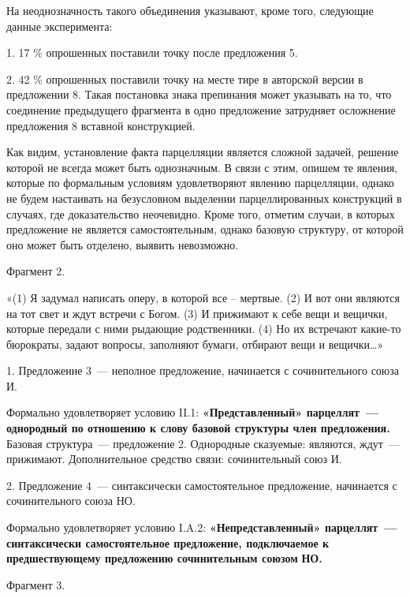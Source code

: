 \documentclass{kursa4}
\begin{document}
{      {}{На неоднозначность такого объединения указывают, кроме того, следующие данные эксперимента:}

      {1. 17 \% опрошенных поставили точку после предложения 5.}

      {2. }{42 \%
      опрошенных поставили точку на месте тире в авторской версии в предложении 8. Такая постановка знака препинания может указывать на то, что соединение предыдущего фрагмента в одно предложение затрудняет осложнение предложения 8 вставной конструкцией. }

      {Как видим, установление факта парцелляции является сложной задачей, решение которой не всегда может быть однозначным. В связи с этим, опишем те явления, которые по формальным условиям удовлетворяют явлению парцелляции, однако не будем настаивать на безусловном выделении парцеллированных конструкций в случаях, где доказательство неочевидно. Кроме того, отметим случаи, в которых предложение не
      }{является}{
      самостоятельным, однако базовую структуру, от которой оно может быть отделено, выявить невозможно. }

      {Фрагмент 2. }

      {«(1) Я задумал написать оперу, в которой все – мертвые. (2) И вот они являются на тот свет и ждут встречи с Богом. (3) И прижимают к себе вещи и вещички, которые передали с ними рыдающие родственники. (4) Но их встречают какие-то бюрократы, задают вопросы, заполняют бумаги, отбирают вещи и вещички…»}

      {1. Предложение 3~--- неполное предложение, начинается с сочинительного союза И.}

      {Формально удовлетворяет условию II.1:
      }\textbf{{«Представленный» парцеллят~--- однородный по отношению к слову базовой структуры член предложения.
      }}{Базовая структура~--- предложение 2. Однородные сказуемые: являются, ждут~--- прижимают. Дополнительное средство связи: сочинительный союз И.}

      {2. Предложение 4~--- синтаксически самостоятельное предложение, начинается с сочинительного союза НО.}



      {Формально удовлетворяет условию I.A.2:
      }\textbf{{«Непредставленный» п}}\textbf{{арцеллят~--- синтаксически самостоятельное предложение, подключаемое к предшествующему предложению сочинительным союз}}\textbf{{ом}}\textbf{\textit{{
      }}}\textbf{{НО.}}


      \bigskip

      {Фрагмент 3.}

}
\end{document}
